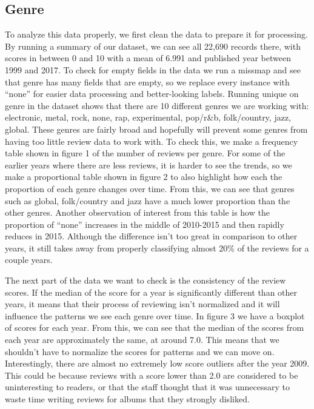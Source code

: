 \documentclass{article}
\begin{document}
\subsection{Genre}\label{genre}

To analyze this data properly, we first clean the data to prepare it for
processing. By running a summary of our dataset, we can see all 22,690
records there, with scores in between 0 and 10 with a mean of 6.991 and
published year between 1999 and 2017. To check for empty fields in the
data we run a missmap and see that genre has many fields that are empty,
so we replace every instance with ``none'' for easier data processing
and better-looking labels. Running unique on genre in the dataset shows
that there are 10 different genres we are working with: electronic,
metal, rock, none, rap, experimental, pop/r\&b, folk/country, jazz,
global. These genres are fairly broad and hopefully will prevent some
genres from having too little review data to work with. To check this,
we make a frequency table shown in figure 1 of the number of reviews per
genre. For some of the earlier years where there are less reviews, it is
harder to see the trends, so we make a proportional table shown in
figure 2 to also highlight how each the proportion of each genre changes
over time. From this, we can see that genres such as global,
folk/country and jazz have a much lower proportion than the other
genres. Another observation of interest from this table is how the
proportion of ``none'' increases in the middle of 2010-2015 and then
rapidly reduces in 2015. Although the difference isn't too great in
comparison to other years, it still takes away from properly classifying
almost 20\% of the reviews for a couple years.

The next part of the data we want to check is the consistency of the
review scores. If the median of the score for a year is significantly
different than other years, it means that their process of reviewing
isn't normalized and it will influence the patterns we see each genre
over time. In figure 3 we have a boxplot of scores for each year. From
this, we can see that the median of the scores from each year are
approximately the same, at around 7.0. This means that we shouldn't have
to normalize the scores for patterns and we can move on. Interestingly,
there are almost no extremely low score outliers after the year 2009.
This could be because reviews with a score lower than 2.0 are considered
to be uninteresting to readers, or that the staff thought that it was
unnecessary to waste time writing reviews for albums that they strongly
disliked.
\end{document}
